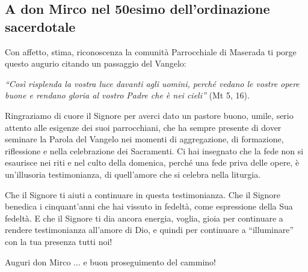 \subsection{A don Mirco nel 50esimo dell'ordinazione sacerdotale}


Con affetto, stima, riconoscenza la comunità Parrocchiale di Maserada ti porge questo augurio citando un passaggio del Vangelo:

\textit{``Così risplenda la vostra luce davanti agli uomini, perché vedano le vostre opere buone e rendano gloria al vostro Padre che è nei cieli''} (Mt 5, 16).

Ringraziamo di cuore il Signore per averci dato un pastore buono, umile, serio attento alle esigenze dei suoi parrocchiani, che ha sempre presente di dover seminare la Parola del Vangelo nei momenti di aggregazione, di formazione, riflessione e nella celebrazione dei Sacramenti. Ci hai insegnato che la fede non si esaurisce nei riti e nel culto della domenica, perché una fede priva delle opere, è un’illusoria testimonianza, di quell’amore che si celebra nella liturgia.

Che il Signore ti aiuti a continuare in questa testimonianza. Che il Signore benedica i cinquant’anni che hai vissuto in fedeltà, come espressione della Sua fedeltà. E che il Signore ti dia ancora energia, voglia, gioia per continuare a rendere testimonianza all’amore di Dio, e quindi per continuare a ``illuminare'' con la tua presenza tutti noi!

Auguri don Mirco ... e buon proseguimento del cammino!


